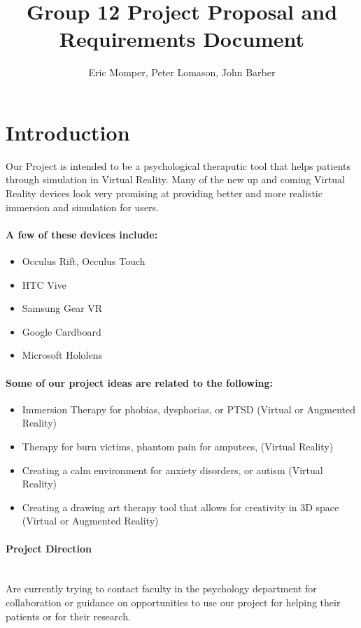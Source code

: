 \documentclass[a4paper,10pt]{article}
\title{Group 12 Project Proposal and Requirements Document}
\author{Eric Momper, Peter Lomason, John Barber}
\begin{document}
\maketitle

\pagebreak
\tableofcontents
\pagebreak

\section{Introduction}
Our Project is intended to be a psychological theraputic tool that helps patients through simulation in Virtual Reality.
Many of the new up and coming Virtual Reality devices look very promising at providing better and more realistic immersion and simulation for users. 
\\
\paragraph{A few of these devices include:}
\begin{itemize}
 \item Occulus Rift, Occulus Touch
 \item HTC Vive
 \item Samsung Gear VR
 \item Google Cardboard
 \item Microsoft Hololens
\end{itemize}

\paragraph{ Some of our project ideas are related to the following:}
\begin{itemize}
 \item ​Immersion Therapy for phobias, dysphorias, or PTSD (Virtual or Augmented Reality)
 \item Therapy for burn victims, phantom pain for amputees,  (Virtual Reality)
 \item Creating a calm environment for  anxiety disorders, or autism (Virtual Reality)
 \item Creating a drawing art therapy tool that allows for creativity in 3D space (Virtual or Augmented Reality)
\end{itemize}


\paragraph{Project Direction} ~\\ Are currently trying to contact faculty in the psychology department for collaboration or 
guidance on opportunities to use our project for helping their patients or for their research.
\end{document}
